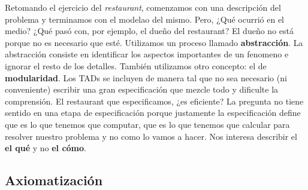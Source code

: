 \documentclass[10pt,a4paper]{article}
\begin{document}
Retomando el ejercicio del \textit{restaurant}, comenzamos con una descripción del problema y terminamos con el modelao del mismo. 
\newline
\newline
Pero, ¿Qué ocurrió en el medio?
\newline
\newline
¿Qué pasó con, por ejemplo, el dueño del restaurant? 
\newline
\newline
El dueño no está porque no es necesario que esté. Utilizamos un proceso llamado \textbf{abstracción}. La abstracción consiste en identificar los aspectos importantes de un fenomeno e ignorar el resto de los detalles.
\newline
\newline
También utilizamos otro concepto: el de \textbf{modularidad}. Los TADs se incluyen de manera tal que no sea necesario (ni conveniente) escribir una gran especificación que mezcle todo y dificulte la comprensión. 
\newline
\newline
El restaurant que especificamos, ¿es eficiente?
\newline
\newline
La pregunta no tiene sentido en una etapa de especificación porque justamente la especificación define que es lo que tenemos que computar, que es lo que tenemos que calcular para resolver nuestro problema y no como lo vamos a hacer. 
\newline
\newline
Nos interesa describir el \textbf{el qué} y no \textbf{el cómo}.

\subsection{Axiomatización}
\end{document}
